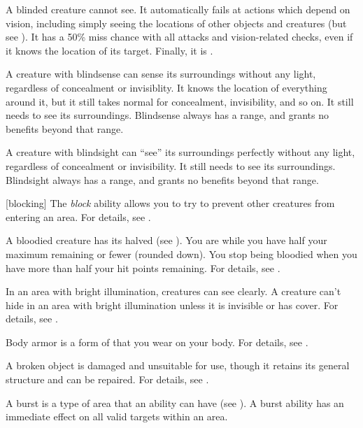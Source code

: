  A blinded creature cannot see. It automatically fails at actions which depend on vision, including simply seeing the locations of other objects and creatures (but see ). It has a 50\% miss chance with all attacks and vision-related checks, even if it knows the location of its target. Finally, it is .

 A creature with blindsense can sense its surroundings without any light, regardless of concealment or invisiblity.
It knows the location of everything around it, but it still takes normal  for concealment, invisibility, and so on.
It still needs  to see its surroundings.
Blindsense always has a range, and grants no benefits beyond that range.

 A creature with blindsight can ``see'' its surroundings perfectly without any light, regardless of concealment or invisibility.
It still needs  to see its surroundings.
Blindsight always has a range, and grants no benefits beyond that range.

[blocking] The \textit{block} ability allows you to try to prevent other creatures from entering an area.
For details, see .

 A bloodied creature has its  halved (see ).
You are  while you have half your maximum  remaining or fewer (rounded down).
You stop being bloodied when you have more than half your hit points remaining.
For details, see .

 In an area with bright illumination, creatures can see clearly.
A creature can't hide in an area with bright illumination unless it is invisible or has cover.
For details, see .

 Body armor is a form of  that you wear on your body.
For details, see .

 A broken object is damaged and unsuitable for use, though it retains its general structure and can be repaired.
For details, see .

 A burst is a type of area that an ability can have (see ).
A burst ability has an immediate effect on all valid targets within an area.

